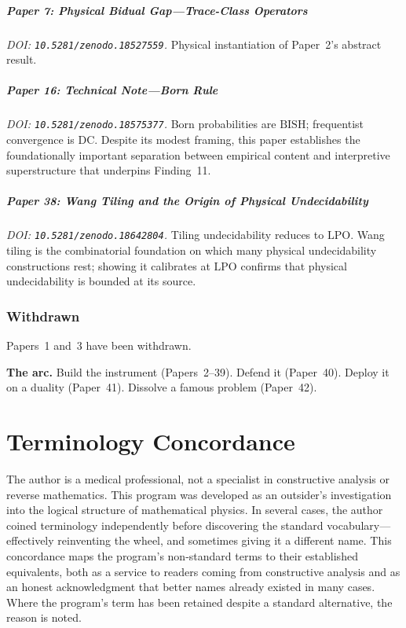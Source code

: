\documentclass[11pt,a4paper]{report}
\theoremstyle{plain}
\theoremstyle{definition}
\theoremstyle{remark}
\newcommand{\BISH}{\mathrm{BISH}}
\newcommand{\LPO}{\mathrm{LPO}}
\newcommand{\DC}{\mathrm{DC}}
\begin{document}
\paragraph{Paper 7: Physical Bidual Gap---Trace-Class Operators}
\emph{DOI: \texttt{10.5281/zenodo.18527559}.}\quad
Physical instantiation of Paper~2's abstract result.

\paragraph{Paper 16: Technical Note---Born Rule}
\emph{DOI: \texttt{10.5281/zenodo.18575377}.}\quad
Born probabilities are $\BISH$; frequentist convergence is $\DC$.  Despite its modest framing, this paper establishes the foundationally important separation between empirical content and interpretive superstructure that underpins Finding~11.

\paragraph{Paper 38: Wang Tiling and the Origin of Physical Undecidability}
\emph{DOI: \texttt{10.5281/zenodo.18642804}.}\quad
Tiling undecidability reduces to $\LPO$.  Wang tiling is the combinatorial foundation on which many physical undecidability constructions rest; showing it calibrates at $\LPO$ confirms that physical undecidability is bounded at its source.

\subsection{Withdrawn}

Papers~1 and~3 have been withdrawn.

\bigskip\noindent
\textbf{The arc.}\quad
Build the instrument (Papers~2--39).  Defend it (Paper~40).  Deploy it on a duality (Paper~41).  Dissolve a famous problem (Paper~42).

\chapter{Terminology Concordance}
\label{app:terminology}

The author is a medical professional, not a specialist in constructive analysis or reverse mathematics.  This program was developed as an outsider's investigation into the logical structure of mathematical physics.  In several cases, the author coined terminology independently before discovering the standard vocabulary---effectively reinventing the wheel, and sometimes giving it a different name.  This concordance maps the program's non-standard terms to their established equivalents, both as a service to readers coming from constructive analysis and as an honest acknowledgment that better names already existed in many cases.  Where the program's term has been retained despite a standard alternative, the reason is noted.
\end{document}
